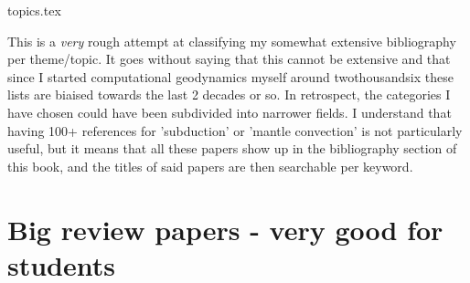 
\begin{flushright} {\tiny {\color{gray} topics.tex}} \end{flushright}

This is a {\it very} rough attempt at classifying my somewhat extensive 
bibliography per theme/topic.
It goes without saying that this cannot be extensive and that since I 
started computational geodynamics myself around twothousandsix these lists are 
biaised towards the last 2 decades or so. 
In retrospect, the categories I have chosen could have been subdivided
into narrower fields. I understand that having 100+ references 
for 'subduction'  or 'mantle convection' is not particularly useful, 
but it means that all these papers show up in the bibliography section 
of this book, and the titles of said papers are then searchable per keyword.

\section{Big review papers - very good for students}

